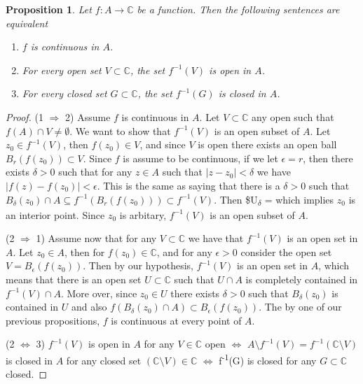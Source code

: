 \documentclass{amsart}
\newtheorem{prop}{Proposition}
\begin{document}
\begin{prop}
Let \(f:A\to\mathbb{C}\) be a function. Then the following sentences are equivalent
\begin{enumerate}
\item \(f\) is continuous in \(A\).
\item For every open set \(V \subset \mathbb{C}\), the set \(f^{-1}(V)\) is open in \(A\).
\item For every closed set \(G \subset \mathbb{C}\), the set \(f^{-1}(G)\) is closed in \(A\).
\end{enumerate}
\end{prop}
\begin{proof}
(1 \(\Rightarrow\) 2) Assume \(f\) is continuous in \(A\). Let \(V\subset \mathbb{C}\) any open such that \(f(A)\cap V \neq \emptyset\). We want to show that \(f^{-1}(V)\) is an open subset of \(A\). Let \(z_0\in f^{-1}(V)\), then \(f(z_0)\in V\), and since \(V\) is open there exists an open ball \(B_r(f(z_0)) \subset V\). Since \(f\) is assume to be continuous, if we let \(\epsilon = r\), then there exists \(\delta >0\) such that for any \(z\in A\) such that \(|z - z_0| <\delta\) we have \(|f(z) - f(z_0)| < \epsilon\). This is the same as saying that there is a \(\delta >0\) such that \(B_{\delta}(z_0)\cap A \subseteq f^{-1}\left(B_{r}(f(z_0))\right) \subset f^{-1}(V)\). Then \$U\textsubscript{\(\delta\)} =  which implies \(z_0\) is an interior point. Since \(z_0\) is arbitary, \(f^{-1}(V)\) is an open subset of \(A\).

(2 \(\Rightarrow\) 1) Assume now that for any \(V\subset \mathbb{C}\) we have that \(f^{-1}(V)\) is an open set in \(A\). Let \(z_0 \in A\), then for \(f(z_0) \in \mathbb{C}\), and for any \(\epsilon >0\) consider the open set \(V = B_{\epsilon}\left(f(z_0)\right)\). Then by our hypothesis, \(f^{-1}(V)\) is an open set in \(A\), which means that there is an open set \(U\subset\mathbb{C}\) such that \(U\cap A\) is completely contained in \(f^{-1}(V)\cap A\). More over, since \(z_0 \in U\) there exists \(\delta>0\) such that \(B_{\delta}(z_0)\) is contained in \(U\) and also \(f(B_{\delta}(z_0)\cap A) \subset B_{\epsilon}(f(z_0))\). The by one of our previous propositions, \(f\) is continuous at every point of \(A\).

(2 \(\Leftrightarrow\) 3) \(f^{-1}(V)\) is open in \(A\) for any \(V\in\mathbb{C}\) open \(\Leftrightarrow\)  \(A \setminus f^{-1}(V) = f^{-1}(\mathbb{C}\setminus V)\) is closed in \(A\) for any closed set  \(\left(\mathbb{C}\setminus V\right)\in\mathbb{C}\) \(\Leftrightarrow\) f\textsuperscript{-1}(G) is closed for any \(G\subset \mathbb{C}\) closed.
\end{proof}
\end{document}
